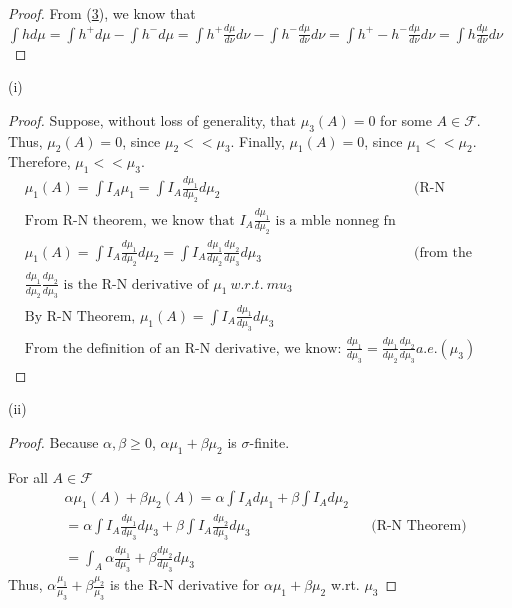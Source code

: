\documentclass[12pt,letterpaper, onecolumn]{exam}
\newcommand{\calF}{\mathcal{F}}
\begin{document}
\begin{questions}
\begin{solution}
\begin{proof}
                From (\underline{3}), we know that \\
                $\int h d \mu = \int h^+ d\mu - \int h^- d\mu = \int h^+ \frac{d \mu}{d \nu} d\nu - \int h^- \frac{d \mu}{d \nu} d\nu = \int h^+ - h^- \frac{d \mu}{d \nu} d\nu = \int h \frac{d \mu}{d \nu} d\nu$
            \end{proof}
        (i) \begin{proof}
            Suppose, without loss of generality, that $\mu_3(A) = 0$ for some $A \in \calF$. Thus, $\mu_2(A) = 0$, since $\mu_2 << \mu_3$. Finally, $\mu_1(A) = 0$, since $\mu_1 << \mu_2$. Therefore, $\mu_1 << \mu_3$. \\

            \begin{align*}
            & \mu_1(A) = \int I_A \mu_1 = \int I_A \frac{d \mu_1}{d \mu_2}d\mu_2 && \textrm{(R-N Theorem)} \\
            & \textrm{From R-N theorem, we know that } I_A \frac{d \mu_1}{d \mu_2} \textrm{ is a mble nonneg fn} \\
            & \mu_1(A) = \int I_A \frac{d \mu_1}{d \mu_2}d\mu_2 = \int I_A \frac{d \mu_1}{d \mu_2}\frac{d\mu_2}{d\mu_3}d\mu_3 && \textrm{(from the Lemma)} \\
            & \frac{d \mu_1}{d \mu_2}\frac{d\mu_2}{d\mu_3} \textrm{ is the R-N derivative of } \mu_1 \: w.r.t. \: mu_3 \\
            & \textrm{By R-N Theorem, } \mu_1(A) = \int I_A \frac{d \mu_1}{d \mu_3} d\mu_3 \\
            & \textrm{From the definition of an R-N derivative, we know: } \frac{d \mu_1}{d \mu_3} = \frac{d \mu_1}{d \mu_2}\frac{d\mu_2}{d\mu_3} a.e.(\mu_3)
            \end{align*}
        \end{proof}

        (ii) \begin{proof}
            Because $\alpha, \beta \geq 0$, $\alpha \mu_1 + \beta \mu_2$ is $\sigma$-finite. 

            For all $A \in \calF$
            \begin{align*}
                &\alpha\mu_1(A) + \beta \mu_2(A) = \alpha \int I_A d \mu_1 + \beta \int I_A d \mu_2 \\
                & = \alpha \int I_A \frac{d\mu_1}{d\mu_3} d\mu_3 + \beta \int I_A \frac{d\mu_2}{d\mu_3}d\mu_3 && \textrm{(R-N Theorem)} \\
                &  = \int_A \alpha \frac{d\mu_1}{d\mu_3}  +  \beta \frac{d\mu_2}{d\mu_3}d\mu_3
            \end{align*}
            Thus, $\alpha \frac{\mu_1}{\mu_3}  +  \beta \frac{\mu_2}{\mu_3}$ is the R-N derivative for $\alpha \mu_1 + \beta \mu_2$ w.rt. $\mu_3$


\end{proof}
\end{solution}
\end{questions}
\end{document}
